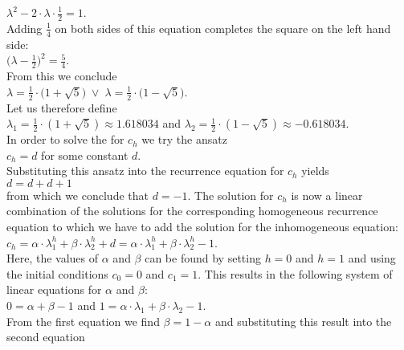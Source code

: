 $\lambda^2 - 2 \cdot \lambda \cdot \frac{1}{2} = 1$.
\\[0.2cm]
Adding $\frac{1}{4}$ on both sides of this equation completes the square on the left hand side:
\\[0.2cm]
\hspace*{1.3cm}
$\bigl(\lambda - \frac{1}{2}\bigr)^2 = \frac{5}{4}$. 
\\[0.2cm]
From this we conclude 
\\[0.2cm]
\hspace*{1.3cm}
$\lambda = \frac{1}{2} \cdot \bigl(1 + \sqrt{5}\bigr) \;\vee\; \lambda = \frac{1}{2} \cdot \bigl(1 - \sqrt{5}\bigr)$.
\\[0.2cm]
Let us therefore define 
\\[0.2cm]
\hspace*{1.3cm}
$\lambda_1 =  \frac{1}{2} \cdot (1 + \sqrt{5}) \approx  1.618034$ \quad and \quad 
$\lambda_2 = \frac{1}{2} \cdot (1 - \sqrt{5}) \approx -0.618034$.
\\[0.2cm]
In order to solve the  for $c_h$ we try the ansatz
\\[0.2cm]
\hspace*{1.3cm}
$c_h = d$ \quad for some constant $d$.
\\[0.2cm]
Substituting this ansatz into the recurrence equation for $c_h$ yields
\\[0.2cm]
\hspace*{1.3cm}
$d = d + d + 1$
\\[0.2cm]
from which we conclude that $d = -1$.  The solution for $c_h$ is now a linear combination of the solutions for
the corresponding homogeneous recurrence equation to which we have to add the solution for the inhomogeneous equation:
\\[0.2cm]
\hspace*{1.3cm}
$c_h = \alpha \cdot \lambda_1^h + \beta \cdot \lambda_2^h + d =\alpha \cdot \lambda_1^h + \beta \cdot \lambda_2^h - 1$.
\\[0.2cm]
Here, the values of $\alpha$ and $\beta$ can be found by setting $h=0$ and $h=1$ and using the
initial conditions $c_0 = 0$ and $c_1 = 1$.  This results in
the following system of linear equations for  $\alpha$ and $\beta$:
\\[0.2cm]
\hspace*{1.3cm}
$0 = \alpha + \beta - 1$ \quad and \quad
$1 = \alpha \cdot \lambda_1 + \beta \cdot \lambda_2 - 1$.
\\[0.2cm]
From the first equation we find $\beta = 1-\alpha$ and substituting this result into the second equation
